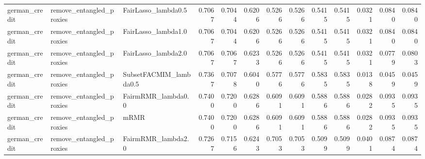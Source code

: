 \begin{tabular}{lllrrrrrrrrrr}
german_credit & remove_entangled_proxies & FairLasso_lambda0.5 & 0.7067 & 0.7044 & 0.6206 & 0.5266 & 0.5266 & 0.5415 & 0.5415 & 0.0321 & 0.0840 & 0.0840 \\
german_credit & remove_entangled_proxies & FairLasso_lambda1.0 & 0.7067 & 0.7044 & 0.6206 & 0.5266 & 0.5266 & 0.5415 & 0.5415 & 0.0321 & 0.0840 & 0.0840 \\
german_credit & remove_entangled_proxies & FairLasso_lambda2.0 & 0.7067 & 0.7067 & 0.6233 & 0.5266 & 0.5266 & 0.5415 & 0.5415 & 0.0321 & 0.0779 & 0.0803 \\
german_credit & remove_entangled_proxies & SubsetFACMIM_lambda0.5 & 0.7367 & 0.7078 & 0.6040 & 0.5776 & 0.5776 & 0.5835 & 0.5835 & 0.0138 & 0.0459 & 0.0459 \\
german_credit & remove_entangled_proxies & FairmRMR_lambda0.0 & 0.7400 & 0.7200 & 0.6286 & 0.6091 & 0.6091 & 0.5886 & 0.5886 & 0.0282 & 0.0935 & 0.0935 \\
german_credit & remove_entangled_proxies & mRMR & 0.7400 & 0.7200 & 0.6286 & 0.6091 & 0.6091 & 0.5886 & 0.5886 & 0.0282 & 0.0935 & 0.0935 \\
german_credit & remove_entangled_proxies & FairmRMR_lambda2.0 & 0.7267 & 0.7156 & 0.6243 & 0.7053 & 0.7053 & 0.5099 & 0.5099 & 0.0401 & 0.0874 & 0.0874 \\
\bottomrule
\end{tabular}
